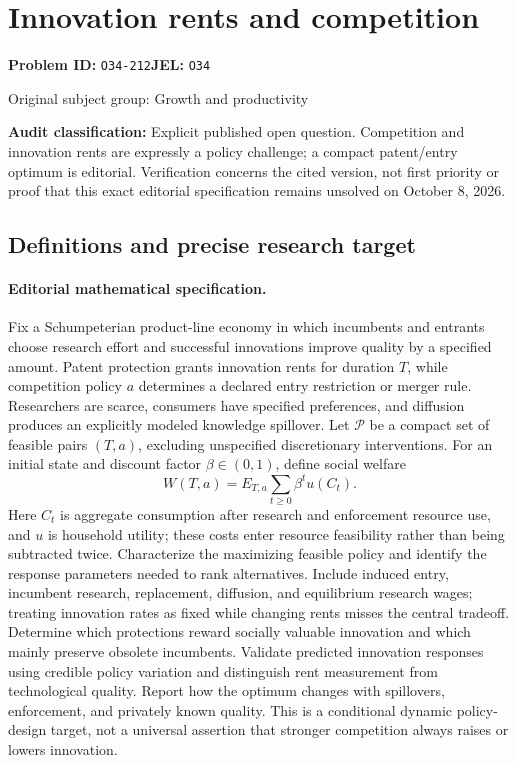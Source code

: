 \documentclass[11pt,a4paper]{article}
\begin{document}
\section*{Innovation rents and competition}
\textbf{Problem ID:} \texttt{O34-212}\quad \textbf{JEL:} \texttt{O34}\par
\label{problem:OP-0268}
{\sffamily\small\color{muted}Original subject group: Growth and productivity\par}
\label{definitions:problem:30007549}
\textbf{Audit classification:} Explicit published open question. Competition and innovation rents are expressly a policy challenge; a compact patent/entry optimum is editorial. Verification concerns the cited version, not first priority or proof that this exact editorial specification remains unsolved on October 8, 2026.
\subsection*{Definitions and precise research target}
\paragraph{Editorial mathematical specification.} Fix a Schumpeterian product-line economy in which incumbents and entrants choose research effort and successful innovations improve quality by a specified amount. Patent protection grants innovation rents for duration \(T\), while competition policy \(a\) determines a declared entry restriction or merger rule. Researchers are scarce, consumers have specified preferences, and diffusion produces an explicitly modeled knowledge spillover. Let \(\mathcal P\) be a compact set of feasible pairs \((T,a)\), excluding unspecified discretionary interventions.
For an initial state and discount factor \(\beta\in(0,1)\), define social welfare
\[
W(T,a)=E_{T,a}\sum_{t\ge0}\beta^t
u(C_t).
\]
Here \(C_t\) is aggregate consumption after research and enforcement resource use, and \(u\) is household utility; these costs enter resource feasibility rather than being subtracted twice. Characterize the maximizing feasible policy and identify the response parameters needed to rank alternatives. Include induced entry, incumbent research, replacement, diffusion, and equilibrium research wages; treating innovation rates as fixed while changing rents misses the central tradeoff. Determine which protections reward socially valuable innovation and which mainly preserve obsolete incumbents. Validate predicted innovation responses using credible policy variation and distinguish rent measurement from technological quality. Report how the optimum changes with spillovers, enforcement, and privately known quality. This is a conditional dynamic policy-design target, not a universal assertion that stronger competition always raises or lowers innovation.
\end{document}
